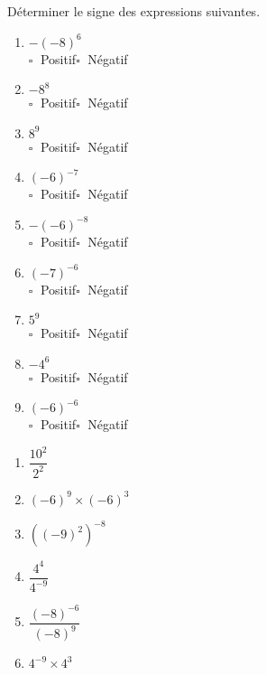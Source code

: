 \documentclass[11pt]{article}
\begin{document}
\begin{exercice}[1]
Déterminer le signe des expressions suivantes.
\begin{multicols}{3}
\begin{enumerate}[label=\arabic*)]
\item  $-(-8)^{6}$ \\	$\square\;$ Positif\qquad $\square\;$ Négatif\qquad  
\item  $-8^{8}$ \\	$\square\;$ Positif\qquad $\square\;$ Négatif\qquad  
\item  $8^{9}$ \\	$\square\;$ Positif\qquad $\square\;$ Négatif\qquad  
\item  $(-6)^{-7}$ \\	$\square\;$ Positif\qquad $\square\;$ Négatif\qquad  
\item  $-(-6)^{-8}$ \\	$\square\;$ Positif\qquad $\square\;$ Négatif\qquad  
\item  $(-7)^{-6}$ \\	$\square\;$ Positif\qquad $\square\;$ Négatif\qquad  
\item  $5^{9}$ \\	$\square\;$ Positif\qquad $\square\;$ Négatif\qquad  
\item  $-4^{6}$ \\	$\square\;$ Positif\qquad $\square\;$ Négatif\qquad  
\item  $(-6)^{-6}$ \\	$\square\;$ Positif\qquad $\square\;$ Négatif\qquad  
\end{enumerate}
\end{multicols}
\end{exercice}


\begin{exercice}[1]
\begin{multicols}{2}
\begin{enumerate}[label=\arabic*)]
\item        $\dfrac{10^{2}}{2^{2}}$ 
\item        $(-6)^{9}\times (-6)^{3}$ 
\item        $\left((-9)^{2}\right)^{-8}$ 
\item        $\dfrac{4^{4}}{4^{-9}}$ 
\item        $\dfrac{(-8)^{-6}}{(-8)^{9}}$ 
\item        $4^{-9}\times 4^{3}$ 
\end{enumerate}
\end{multicols}
\end{exercice}
\end{document}

